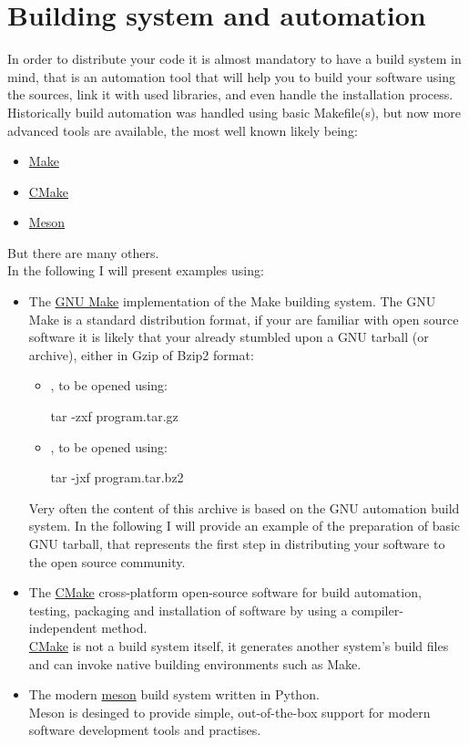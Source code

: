 \chapter{Building system and automation}

In order to distribute your code it is almost mandatory to have a build system in mind, that is an automation tool that will help you to build your software using the sources, link it with used libraries, and even handle the installation process. \\
Historically build automation was handled using basic Makefile(s), but now more advanced tools are available, the most well known likely being:
\begin{itemize}
\item \href{https://en.wikipedia.org/wiki/Make\_(software)}{Make} 
\item \href{https://en.wikipedia.org/wiki/CMake}{CMake}
\item \href{https://en.wikipedia.org/wiki/Meson\_(software)}{Meson}
\end{itemize}
But there are many others. \\
In the following I will present examples using:
\begin{itemize}
\item The \href{https://www.gnu.org/software/make/}{GNU Make} implementation of the Make building system. 
The GNU Make is a standard distribution format, if your are familiar with open source software it is likely that your already stumbled upon a GNU tarball (or archive), 
either in Gzip of Bzip2 format:
\begin{itemize}
\item {}, to be opened using: \begin{script}\fprompt{~} tar -zxf program.tar.gz\end{script}
\item {}, to be opened using: \begin{script}\fprompt{~} tar -jxf program.tar.bz2\end{script}
\end{itemize}
Very often the content of this archive is based on the GNU automation build system. 
In the following I will provide an example of the preparation of basic GNU tarball, that represents the first step in distributing your software to the open source community.
\item The \href{https://cmake.org/}{CMake} cross-platform open-source software for build automation, testing, packaging and installation of software by using a compiler-independent method. \\
\href{https://cmake.org/}{CMake} is not a build system itself, it generates another system's build files and can invoke native building environments such as Make. 
\item The modern \href{https://mesonbuild.com}{meson} build system written in Python. \\
Meson is desinged to provide simple, out-of-the-box support for modern software development tools and practises.
\end{itemize}

